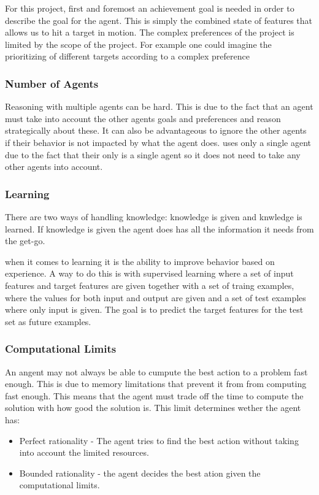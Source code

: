 For this project, first and foremost an achievement goal is needed in order to
describe the goal for the agent. This is simply the combined state of features
that allows us to hit a target in motion. The complex preferences of the
project is limited by the scope of the project. For example one could imagine
the prioritizing of different targets according to a complex preference

\subsubsection{Number of Agents}
Reasoning with multiple agents can be hard. This is due to the fact that an
agent must take into account the other agents goals and preferences and reason
strategically about these. It can also be advantageous to ignore the other
agents if their behavior is not impacted by what the agent does.
\namep uses only a single agent due to the fact that their only is a single
agent so it does not need to take any other agents into account.




\subsubsection{Learning}
There are two ways of handling knowledge: knowledge is given and knwledge is
learned. If knowledge is given the agent does has all the information it needs
from the get-go.\nl 

when it comes to learning it is the ability to improve
behavior based on experience. A way to do this is with supervised learning where
a set of input features and target features are given together with a set of
traing examples, where the values for both input and output are given and a set
of test examples where only input is given. The goal is to predict the target
features for the test set as future examples.


\subsubsection{Computational Limits}
An angent may not always be able to cumpute the best action to a problem fast
enough. This is due to memory limitations that prevent it from from computing
fast enough. This means that the agent must trade off the time to compute the
solution with how good the solution is. This limit determines wether the agent
has:

\begin{itemize}
  \item Perfect rationality - The agent tries to find the best action without
  taking into account the limited resources.
  \item Bounded rationality - the agent decides the best ation given the
  computational limits.
\end{itemize}

